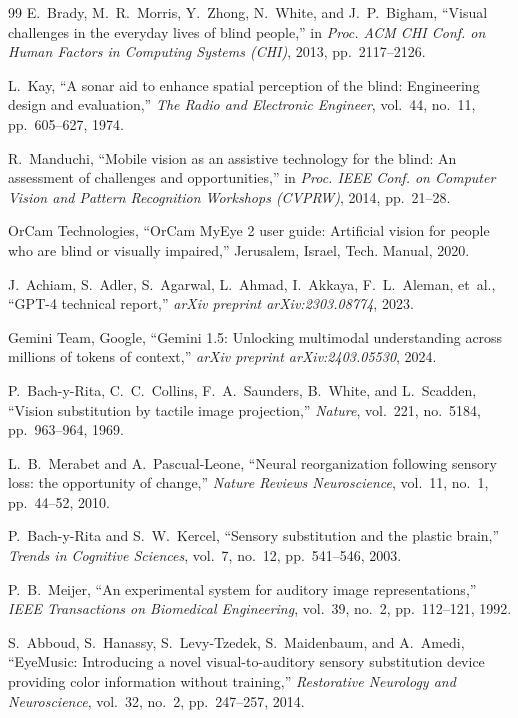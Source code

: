 \documentclass[10pt,twocolumn]{article}
\begin{document}
\begin{thebibliography}{99}
E.~Brady, M.~R.~Morris, Y.~Zhong, N.~White, and J.~P.~Bigham, ``Visual challenges in the everyday lives of blind people,'' in \emph{Proc. ACM CHI Conf. on Human Factors in Computing Systems (CHI)}, 2013, pp.~2117--2126.

L.~Kay, ``A sonar aid to enhance spatial perception of the blind: Engineering design and evaluation,'' \emph{The Radio and Electronic Engineer}, vol.~44, no.~11, pp.~605--627, 1974.

R.~Manduchi, ``Mobile vision as an assistive technology for the blind: An assessment of challenges and opportunities,'' in \emph{Proc. IEEE Conf. on Computer Vision and Pattern Recognition Workshops (CVPRW)}, 2014, pp.~21--28.

OrCam Technologies, ``OrCam MyEye 2 user guide: Artificial vision for people who are blind or visually impaired,'' Jerusalem, Israel, Tech. Manual, 2020.

J.~Achiam, S.~Adler, S.~Agarwal, L.~Ahmad, I.~Akkaya, F.~L.~Aleman, et~al., ``GPT-4 technical report,'' \emph{arXiv preprint arXiv:2303.08774}, 2023.

Gemini Team, Google, ``Gemini 1.5: Unlocking multimodal understanding across millions of tokens of context,'' \emph{arXiv preprint arXiv:2403.05530}, 2024.

P.~Bach-y-Rita, C.~C.~Collins, F.~A.~Saunders, B.~White, and L.~Scadden, ``Vision substitution by tactile image projection,'' \emph{Nature}, vol.~221, no.~5184, pp.~963--964, 1969.

L.~B.~Merabet and A.~Pascual-Leone, ``Neural reorganization following sensory loss: the opportunity of change,'' \emph{Nature Reviews Neuroscience}, vol.~11, no.~1, pp.~44--52, 2010.

P.~Bach-y-Rita and S.~W.~Kercel, ``Sensory substitution and the plastic brain,'' \emph{Trends in Cognitive Sciences}, vol.~7, no.~12, pp.~541--546, 2003.

P.~B.~Meijer, ``An experimental system for auditory image representations,'' \emph{IEEE Transactions on Biomedical Engineering}, vol.~39, no.~2, pp.~112--121, 1992.

S.~Abboud, S.~Hanassy, S.~Levy-Tzedek, S.~Maidenbaum, and A.~Amedi, ``EyeMusic: Introducing a novel visual-to-auditory sensory substitution device providing color information without training,'' \emph{Restorative Neurology and Neuroscience}, vol.~32, no.~2, pp.~247--257, 2014.


\end{thebibliography}
\end{document}
